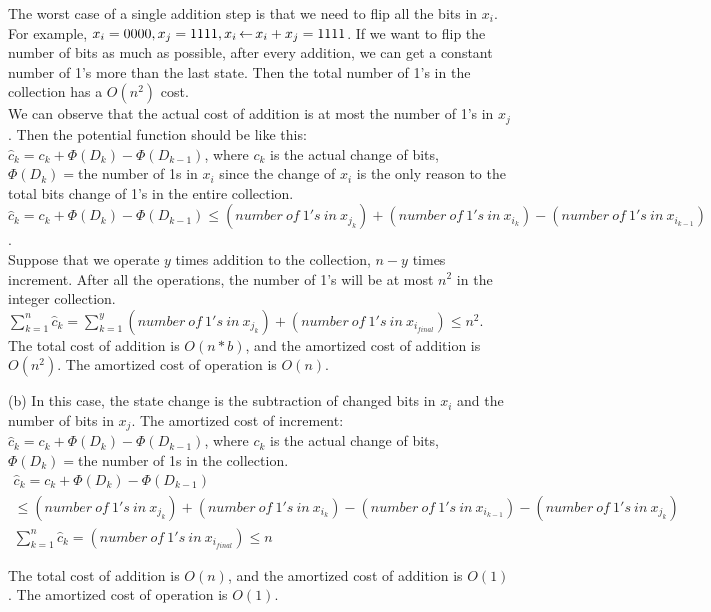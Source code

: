 \documentclass[11pt]{article}
\begin{document}
The worst case of a single addition step is that we need to flip all the bits in $x_i$. For example, $x_i=0000, x_j=1111, x_i {\,\leftarrow\,} x_i+x_j = 1111$. If we want to flip the number of bits as much as possible, after every addition, we can get a constant number of 1's more than the last state. Then the total number of 1's in the collection has a $O(n^2)$ cost.\\
We can observe that the actual cost of addition is at most the number of 1's in $x_j$. Then the potential function should be like this:\\
 $\hat c_k = c_k + \Phi(D_k) - \Phi(D_{k-1})$, where $c_k$ is the actual change of bits, $\Phi(D_k) = $the number of 1s in $x_i$ since the change of $x_i$ is the only reason to the total bits change of 1's in the entire collection.\\
$\hat c_k = c_k + \Phi(D_k) - \Phi(D_{k-1}) \leq (number\: of\: 1's\: in\: x_{j_k}) + (number\: of\: 1's\: in\: x_{i_k}) - (number\: of\: 1's\: in\: x_{i_{k-1}})$.\\
Suppose that we operate $y$ times addition to the collection, $n-y$ times increment. After all the operations, the number of 1's will be at most $n^2$ in the integer collection.\\
$\sum\limits_{k=1}^n \hat c_k = \sum\limits_{k=1}^y (number\: of\: 1's\: in\: x_{j_k}) + (number\: of\: 1's\: in\: x_{i_{final}}) \leq n^2$.\\
The total cost of addition is $O(n*b)$, and the amortized cost of addition is $O(n^2)$. The amortized cost of operation is $O(n)$.

(b)
In this case, the state change is the subtraction of changed bits in $x_i$ and the number of bits in $x_j$.
The amortized cost of increment: $\hat c_k = c_k + \Phi(D_k) - \Phi(D_{k-1})$, where $c_k$ is the actual change of bits, $\Phi(D_k) = $the number of 1s in the collection.
\begin{gather*}
    \hat c_k = c_k + \Phi(D_k) - \Phi(D_{k-1}) \\
    \leq (number\: of\: 1's\: in\: x_{j_k}) + (number\: of\: 1's\: in\: x_{i_k}) - (number\: of\: 1's\: in\: x_{i_{k-1}}) - (number\: of\: 1's\: in\: x_{j_k})\\
    \sum\limits_{k=1}^n \hat c_k = (number\: of\: 1's\: in\: x_{i_{final}}) \leq n
\end{gather*}

The total cost of addition is $O(n)$, and the amortized cost of addition is $O(1)$. The amortized cost of operation is $O(1)$.\\
\end{document}
